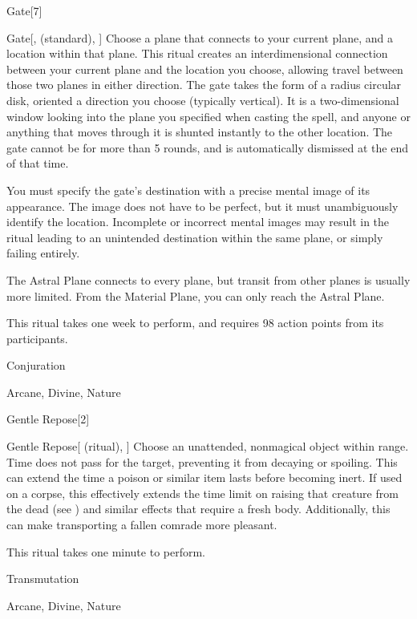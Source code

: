 \begin{spellsection}{Gate}[7]


\begin{ability}{Gate}[,  (standard), ]
Choose a plane that connects to your current plane, and a location within that plane.
This ritual creates an interdimensional connection between your current plane and the location you choose, allowing travel between those two planes in either direction.
The gate takes the form of a \areasmall radius circular disk, oriented a direction you choose (typically vertical).
It is a two-dimensional window looking into the plane you specified when casting the spell, and anyone or anything that moves through it is shunted instantly to the other location.
The gate cannot be  for more than 5 rounds, and is automatically dismissed at the end of that time.

You must specify the gate's destination with a precise mental image of its appearance.
The image does not have to be perfect, but it must unambiguously identify the location.
Incomplete or incorrect mental images may result in the ritual leading to an unintended destination within the same plane, or simply failing entirely.

The Astral Plane connects to every plane, but transit from other planes is usually more limited.
From the Material Plane, you can only reach the Astral Plane.

This ritual takes one week to perform, and requires 98 action points from its participants.
\end{ability}




 Conjuration

 Arcane, Divine, Nature
\end{spellsection}


\begin{spellsection}{Gentle Repose}[2]


\begin{ability}{Gentle Repose}[ (ritual), ]
Choose an unattended, nonmagical object within \rngclose range.
Time does not pass for the target, preventing it from decaying or spoiling.
This can extend the time a poison or similar item lasts before becoming inert.
If used on a corpse, this effectively extends the time limit on raising that creature from the dead (see ) and similar effects that require a fresh body.
Additionally, this can make transporting a fallen comrade more pleasant.

This ritual takes one minute to perform.
\end{ability}




 Transmutation

 Arcane, Divine, Nature
\end{spellsection}


